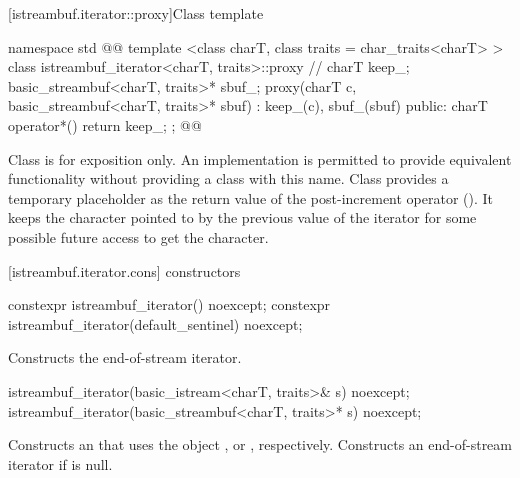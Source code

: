 [istreambuf.iterator::proxy]{Class template }

%
\begin{codeblock}
namespace std { @@
  template <class charT, class traits = char_traits<charT> >
  class istreambuf_iterator<charT, traits>::proxy { // \expos
    charT keep_;
    basic_streambuf<charT, traits>* sbuf_;
    proxy(charT c, basic_streambuf<charT, traits>* sbuf)
      : keep_(c), sbuf_(sbuf) { }
  public:
    charT operator*() { return keep_; }
  };
}@\added{\}\}\}}@
\end{codeblock}

\pnum
Class
is for exposition only.
An implementation is permitted to provide equivalent functionality without
providing a class with this name.
Class
provides a temporary
placeholder as the return value of the post-increment operator
().
It keeps the character pointed to by the previous value
of the iterator for some possible future access to get the character.

[istreambuf.iterator.cons]{ constructors}


%
\begin{itemdecl}
constexpr istreambuf_iterator() noexcept;
constexpr istreambuf_iterator(default_sentinel) noexcept;
\end{itemdecl}

\begin{itemdescr}
\pnum
\effects
Constructs the end-of-stream iterator.
\end{itemdescr}

%
\begin{itemdecl}
istreambuf_iterator(basic_istream<charT, traits>& s) noexcept;
istreambuf_iterator(basic_streambuf<charT, traits>* s) noexcept;
\end{itemdecl}

\begin{itemdescr}
\pnum
\effects
Constructs an
that uses the
object
,
or
,
respectively.
Constructs an end-of-stream iterator if
is null.
\end{itemdescr}


